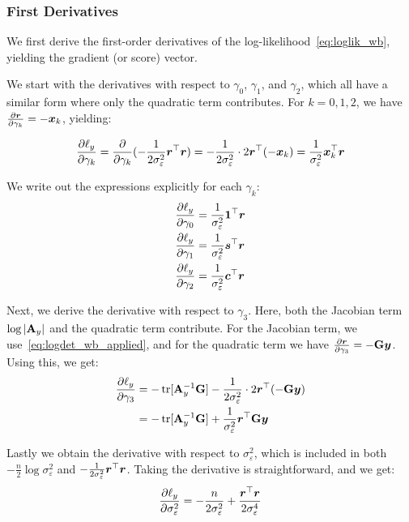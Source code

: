 \subsubsection{First Derivatives}

We first derive the first-order derivatives of the log-likelihood~\eqref{eq:loglik_wb}, yielding the gradient (or score) vector.

We start with the derivatives with respect to $\gamma_0$, $\gamma_1$, and $\gamma_2$, which all have a similar form where only the quadratic term contributes. For $k = 0, 1, 2$, we have $\frac{\partial \bm{r}}{\partial \gamma_k} = -\bm{x}_k$, yielding:

\begin{align}
    \frac{\partial \ell_y}{\partial \gamma_k} = \frac{\partial}{\partial \gamma_k} (-\frac{1}{2\sigma_\varepsilon^2}\bm{r}^\top\bm{r}) = -\frac{1}{2\sigma_\varepsilon^2} \cdot 2\bm{r}^\top(-\bm{x}_k) = \frac{1}{\sigma_\varepsilon^2}\bm{x}_k^\top\bm{r}
\end{align}

We write out the expressions explicitly for each $\gamma_k$:
\begin{align}
    \frac{\partial \ell_y}{\partial \gamma_0} &=
    \frac{1}{\sigma_\varepsilon^2}\bm{1}^\top\bm{r} \label{eq:score_g0}\\
    \frac{\partial \ell_y}{\partial \gamma_1} &=
    \frac{1}{\sigma_\varepsilon^2}\bm{s}^\top\bm{r} \\
    \frac{\partial \ell_y}{\partial \gamma_2} &=
    \frac{1}{\sigma_\varepsilon^2}\bm{c}^\top\bm{r}
\end{align}

Next, we derive the derivative with respect to $\gamma_3$. Here, both the Jacobian term $\log|\mathbf{A}_y|$ and the quadratic term contribute. For the Jacobian term, we use~\eqref{eq:logdet_wb_applied}, and for the quadratic term we have $\frac{\partial \bm{r}}{\partial \gamma_3} = -\mathbf{G}\bm{y}$. Using this, we get:
\begin{align}
    \frac{\partial \ell_y}{\partial \gamma_3}
    &= -\operatorname{tr}[\mathbf{A}_y^{-1}\mathbf{G}] - \frac{1}{2\sigma_\varepsilon^2} \cdot 2\bm{r}^\top(-\mathbf{G}\bm{y}) \nonumber\\
    &= -\operatorname{tr}[\mathbf{A}_y^{-1}\mathbf{G}] + \frac{1}{\sigma_\varepsilon^2}\bm{r}^\top\mathbf{G}\bm{y} \label{eq:score_g3}
\end{align}

Lastly we obtain the derivative with respect to $\sigma_\varepsilon^2$, which is included in both $-\frac{n}{2}\log\sigma_\varepsilon^2$ and $-\frac{1}{2\sigma_\varepsilon^2}\bm{r}^\top\bm{r}$. Taking the derivative is straightforward, and we get:
\begin{equation}
\label{eq:score_sigma}
    \frac{\partial \ell_y}{\partial \sigma_\varepsilon^2}
    = -\frac{n}{2\sigma_\varepsilon^2} + \frac{\bm{r}^\top\bm{r}}{2\sigma_\varepsilon^4}
\end{equation}

